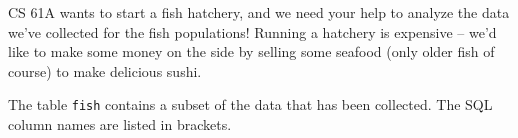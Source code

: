 CS 61A wants to start a fish hatchery, and we need your help to analyze the data we've collected for the fish populations! Running a hatchery is expensive -- we'd like to make some money on the side by selling some seafood (only older fish of course) to make delicious sushi.

The table \lstinline$fish$ contains a subset of the data that has been collected. The SQL column names are listed in brackets.

